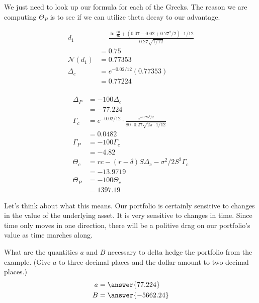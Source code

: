 \documentclass{ximera}
\begin{document}
\begin{solution}
We just need to look up our formula for each of the Greeks. The reason we are computing $\Theta_P$ is to see if we can utilize theta decay to our advantage.

	\begin{align*}
	d_1 			&=\frac{\ln\frac{80}{76}+(0.07-0.02+0.27^2/2)\cdot 1/12}{0.27\sqrt{1/12}}\\
				&=0.75\\
	\mathcal{N}(d_1) 	&=0.77353\\
	\Delta_c 		&=e^{-0.02/12}(0.77353)\\
				&=0.77224\\
	\end{align*}

	\begin{align*}
	\Delta_P 		&=-100\Delta_c\\
				&=-77.224\\
	\Gamma_c 		&=e^{-0.02/12}\cdot\frac{e^{-0.75^2/2}}{80\cdot0.27\sqrt{2\pi\cdot 1/12}}\\
				&=0.0482\\
	\Gamma_P 		&=-100\Gamma_c\\
				&=-4.82\\
	\Theta_c 		&=rc-(r-\delta)S\Delta_c-\sigma^2/2S^2\Gamma_c\\
				&=-13.9719\\
	\Theta_P 		&=-100\Theta_c\\
				&=1397.19
	\end{align*}
\end{solution}

Let's think about what this means. Our portfolio is certainly sensitive to changes in the value of the underlying asset. It is very sensitive to changes in time. Since time only moves in one direction, there will be a politive drag on our portfolio's value as time marches along.

\begin{question}
What are the quantities $a$ and $B$ necessary to delta hedge the portfolio from the example. (Give $a$ to three decimal places and the dollar amount to two decimal places.) 
	\begin{align*}
	a 	&=\answer{77.224}\\
	B 	&=\answer{-5662.24}
	\end{align*}
\end{question}
\end{document}
